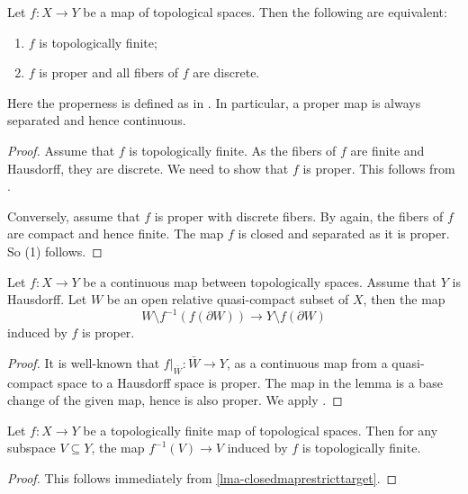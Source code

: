 \begin{proposition}\label{prop-topfinitechar}
    Let $f:X\rightarrow Y$ be a map of topological spaces. Then the following are equivalent:
    \begin{enumerate}
        \item $f$ is topologically finite;
        \item $f$ is proper and all fibers of $f$ are discrete.
    \end{enumerate}
\end{proposition}
Here the properness is defined as in \cite[\href{https://stacks.math.columbia.edu/tag/005O}{Tag 005O}]{stacks-project}. In particular, a proper map is always separated and hence continuous.
\begin{proof}
    Assume that $f$ is topologically finite. As the fibers of $f$ are finite and Hausdorff, they are discrete.
    We need to show that $f$ is proper. This follows from \cite[\href{https://stacks.math.columbia.edu/tag/005R}{Tag 005R}]{stacks-project}.

    Conversely, assume that $f$ is proper with discrete fibers. By \cite[\href{https://stacks.math.columbia.edu/tag/005R}{Tag 005R}]{stacks-project} again, the fibers of $f$ are compact and hence finite. The map $f$ is closed and separated as it is proper. So (1) follows.
\end{proof}

\begin{lemma}\label{lma-qcpttoHausdorffproper}
    Let $f:X\rightarrow Y$ be a continuous map between topologically spaces. Assume that $Y$ is Hausdorff.
    Let $W$ be an open relative quasi-compact subset of $X$, then the map
    \[
        W\setminus f^{-1}(f(\partial W))\rightarrow Y\setminus f(\partial W)
    \]
    induced by $f$ is proper.
\end{lemma}
\begin{proof}
    It is well-known that $f|_{\bar{W}}:\bar{W}\rightarrow Y$, as a continuous map from a quasi-compact space to a Hausdorff space is proper. The map in the lemma is a base change of the given map, hence is also proper. We apply \cite[\href{https://stacks.math.columbia.edu/tag/005R}{Tag 005R}]{stacks-project}.
\end{proof}

\begin{proposition}
    Let $f:X\rightarrow Y$ be a topologically finite map of topological spaces. Then for any subspace $V\subseteq Y$, the map $f^{-1}(V)\rightarrow V$ induced by $f$ is topologically finite.
\end{proposition}
\begin{proof}
    This follows immediately from \cref{lma-closedmaprestricttarget}.
\end{proof}

